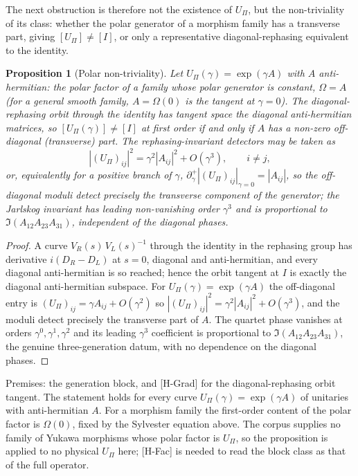 \documentclass[11pt]{article}
\newtheorem{proposition}{Proposition}
\theoremstyle{definition}
\theoremstyle{remark}
\newcommand{\Upi}{U_{\Pi}}
\newcommand{\Opol}{\Omega}
\begin{document}
    The next obstruction is therefore not the existence of $\Upi$, but the non-triviality of its class: whether
    the polar generator of a morphism family has a transverse part, giving $[\Upi] \neq [I]$, or only a representative
    diagonal-rephasing equivalent to the identity.

    \begin{proposition}[Polar non-triviality]
      \label{prop:polar-nontriviality}
      Let $\Upi(\gamma) = \exp(\gamma A)$ with $A$ anti-hermitian: the polar factor of a family whose polar generator
      is constant, $\Opol = A$ (for a general smooth family, $A = \Opol(0)$ is the tangent at $\gamma = 0$).
      The diagonal-rephasing orbit through the identity has tangent space the diagonal anti-hermitian
      matrices, so $[\Upi(\gamma)] \neq [I]$ at first order if and only if $A$ has a non-zero off-diagonal
      (transverse) part.
      The rephasing-invariant detectors may be taken as
      \[
        |(\Upi)_{ij}|^{2} = \gamma^{2}|A_{ij}|^{2} + O(\gamma^{3}), \qquad i \neq j ,
      \]
      or, equivalently for a positive branch of $\gamma$, $\partial_{\gamma}^{+}|(\Upi)_{ij}|_{\gamma = 0} =
      |A_{ij}|$, so the off-diagonal moduli detect precisely the transverse component of the
      generator; the Jarlskog invariant has leading non-vanishing order $\gamma^{3}$ and is proportional to
      $\Im(A_{12}A_{23}A_{31})$, independent of the diagonal phases.
    \end{proposition}

    \begin{proof}
      A curve $V_{R}(s)\,V_{L}(s)^{-1}$ through the identity in the rephasing group has derivative
      $i(D_{R} - D_{L})$ at $s = 0$, diagonal and anti-hermitian, and every diagonal anti-hermitian is so
      reached; hence the orbit tangent at $I$ is exactly the diagonal anti-hermitian subspace.
      For $\Upi(\gamma) = \exp(\gamma A)$ the off-diagonal entry is $(\Upi)_{ij} = \gamma A_{ij} + O(\gamma^{2})$
      so $|(\Upi)_{ij}|^{2} = \gamma^{2}|A_{ij}|^{2} + O(\gamma^{3})$, and the moduli detect precisely the
      transverse part of $A$.
      The quartet phase vanishes at orders $\gamma^{0}, \gamma^{1}, \gamma^{2}$ and its leading $\gamma^{3}$
      coefficient is proportional to $\Im(A_{12}A_{23}A_{31})$, the genuine three-generation datum, with no
      dependence on the diagonal phases.
    \end{proof}

    Premises: the generation block, and [H-Grad] for the diagonal-rephasing orbit tangent.
    The statement holds for every curve $\Upi(\gamma) = \exp(\gamma A)$ of unitaries with anti-hermitian $A$.
    For a morphism family the first-order content of the polar factor is $\Opol(0)$, fixed by the Sylvester equation
    above.
    The corpus supplies no family of Yukawa morphisms whose polar factor is $\Upi$, so the proposition is applied to no
    physical $\Upi$ here; [H-Fac] is needed to read the block class as that of the full operator.
\end{document}
